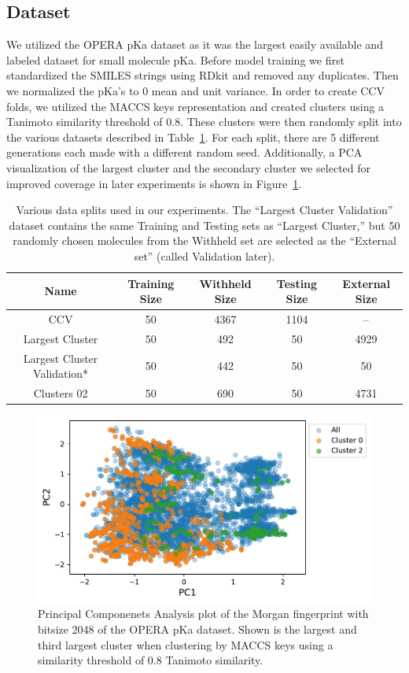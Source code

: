\documentclass[journal=jmcmar,manuscript=article]{achemso}
\begin{document}
\subsection{Dataset}
We utilized the OPERA pKa dataset\cite{operapKa} as it was the largest easily available and labeled dataset for small molecule pKa. Before model training we first standardized the SMILES\cite{smiles} strings using RDkit\cite{rdkit} and removed any duplicates. Then we normalized the pKa's to 0 mean and unit variance. In order to create CCV folds, we utilized the MACCS keys \cite{maccskeys} representation and created clusters using a Tanimoto similarity threshold of 0.8. These clusters were then randomly split into the various datasets described in Table~\ref{tab:datasets}. For each split, there are 5 different generations each made with a different random seed. Additionally, a PCA visualization of the largest cluster and the secondary cluster we selected for improved coverage in later experiments is shown in Figure~\ref{fig:pcaclusters}.

\begin{table}[]
    \centering
    \begin{tabular}{c|c|c|c|c}
    \hline
        Name & Training Size & Withheld Size & Testing Size & External Size \\
    \hline
        CCV & 50 & 4367 & 1104 & -- \\
        Largest Cluster & 50 & 492 & 50 & 4929 \\
        Largest Cluster Validation* & 50 & 442 & 50 & 50 \\
        Clusters 02 & 50 & 690 & 50 & 4731 \\
    \hline
    \end{tabular}
    \caption{Various data splits used in our experiments. The ``Largest Cluster Validation'' dataset contains the same Training and Testing sets as ``Largest Cluster,'' but 50 randomly chosen molecules from the Withheld set are selected as the ``External set'' (called Validation later).}
    \label{tab:datasets}
\end{table}

\begin{figure}[tbph]
    \centering
    \includegraphics[width=.6\linewidth]{figures/fig1_pca.pdf}
    \caption{Principal Componenets Analysis plot of the Morgan fingerprint with bitsize 2048 of the OPERA pKa dataset. Shown is the largest and third largest cluster when clustering by MACCS keys using a similarity threshold of 0.8 Tanimoto similarity.}
    \label{fig:pcaclusters}
\end{figure}
\end{document}
